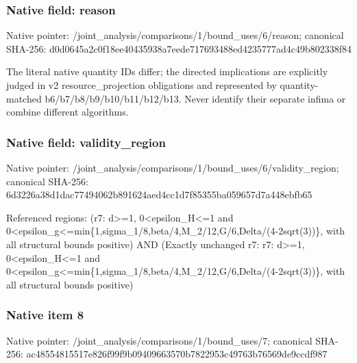 \documentclass[10pt,a4paper]{article}
\begin{document}
\subsubsection{Native field: reason}
Native pointer: /joint\_\allowbreak{}analysis/comparisons/1/bound\_\allowbreak{}uses/6/reason; canonical SHA-256: d0d0645a2c0f18ee40435938a7eede717693488ed4235777ad4c49b802338f84

\begingroup\raggedright\sloppy The literal native quantity IDs differ;\allowbreak{} the directed implications are explicitly judged in v2 resource\_\allowbreak{}projection obligations and represented by quantity-matched b6/\allowbreak{}b7/\allowbreak{}b8/\allowbreak{}b9/\allowbreak{}b10/\allowbreak{}b11/\allowbreak{}b12/\allowbreak{}b13. Never identify their separate infima or combine different algorithms.\par\endgroup

\subsubsection{Native field: validity\_\allowbreak{}region}
Native pointer: /joint\_\allowbreak{}analysis/comparisons/1/bound\_\allowbreak{}uses/6/validity\_\allowbreak{}region; canonical SHA-256: 6d3226a38d1dac77494062b891624aed4cc1d7f85355ba059657d7a448ebfb65

\begingroup\raggedright\sloppy Referenced regions:\allowbreak{} (r7:\allowbreak{} d>=\allowbreak{}1,\allowbreak{} 0<epsilon\_\allowbreak{}H<=\allowbreak{}1 and 0<epsilon\_\allowbreak{}g<=\allowbreak{}min\{1,\allowbreak{}sigma\_\allowbreak{}1/\allowbreak{}8,\allowbreak{}beta/\allowbreak{}4,\allowbreak{}M\_\allowbreak{}2/\allowbreak{}12,\allowbreak{}G/\allowbreak{}6,\allowbreak{}Delta/\allowbreak{}(4-2sqrt(3))\},\allowbreak{} with all structural bounds positive) AND (Exactly unchanged r7:\allowbreak{} r7:\allowbreak{} d>=\allowbreak{}1,\allowbreak{} 0<epsilon\_\allowbreak{}H<=\allowbreak{}1 and 0<epsilon\_\allowbreak{}g<=\allowbreak{}min\{1,\allowbreak{}sigma\_\allowbreak{}1/\allowbreak{}8,\allowbreak{}beta/\allowbreak{}4,\allowbreak{}M\_\allowbreak{}2/\allowbreak{}12,\allowbreak{}G/\allowbreak{}6,\allowbreak{}Delta/\allowbreak{}(4-2sqrt(3))\},\allowbreak{} with all structural bounds positive)\par\endgroup

\subsubsection{Native item 8}
Native pointer: /joint\_\allowbreak{}analysis/comparisons/1/bound\_\allowbreak{}uses/7; canonical SHA-256: ac48554815517e826f99f9b09409663570b7822953c49763b76569de9ccdf987
\end{document}

